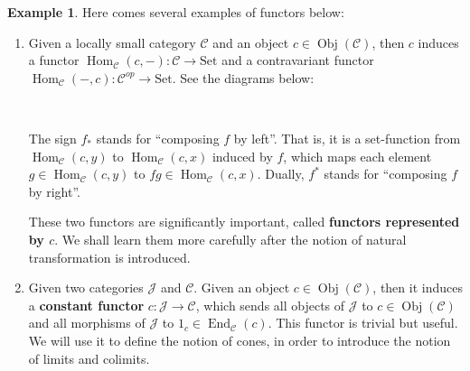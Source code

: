 \documentclass{article}
\theoremstyle{definition}
\theoremstyle{definition}
\newtheorem{example}{Example}[section]
\theoremstyle{remark}
\DeclareMathOperator{\Obj}{Obj}
\DeclareMathOperator{\Hom}{Hom}
\DeclareMathOperator{\End}{End}
\begin{document}
	\begin{example}
	Here comes several examples of functors below:
	\begin{enumerate}[label=(\roman*)]
	\item Given a locally small category $\mathcal{C}$ and an object $c\in \Obj(\mathcal{C})$, then $c$ induces a functor $\Hom_{\mathcal{C}}(c,-):\mathcal{C}\to \mathrm{Set}$ and a contravariant functor $\Hom_{\mathcal{C}}(-,c):\mathcal{C}^{op}\to \mathrm{Set}$. See the diagrams below:
	
	\begin{center}
	\ \ \ \ \ \ \ \ \ 
	\end{center}
	The sign $f_*$ stands for ``composing $f$ by left''. That is, it is a set-function from $\Hom_\mathcal{C}(c,y)$ to $\Hom_\mathcal{C}(c,x)$ induced by $f$, which maps each element $g\in \Hom_\mathcal{C}(c,y)$ to $fg\in \Hom_\mathcal{C}(c,x)$. Dually, $f^*$ stands for ``composing $f$ by right''.\par
	These two functors are significantly important, called \textbf{functors represented by $c$}. We shall learn them more carefully after the notion of natural transformation is introduced.
	\item Given two categories $\mathcal{J}$ and $\mathcal{C}$. Given an object $c\in \Obj(\mathcal{C})$, then it induces a \textbf{constant functor} $c:\mathcal{J}\to \mathcal{C}$, which sends all objects of $\mathcal{J}$ to $c\in\Obj(\mathcal{C})$ and all morphisms of $\mathcal{J}$ to $1_c\in\End_\mathcal{C}(c)$. This functor is trivial but useful. We will use it to define the notion of cones, in order to introduce the notion of limits and colimits.

\end{enumerate}
\end{example}
\end{document}
